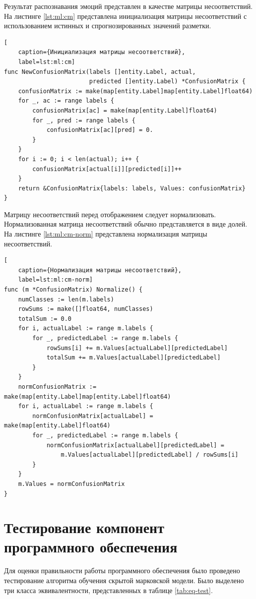Результат распознавания эмоций представлен в качестве матрицы несоответствий. На листинге \ref{lst:ml:cm} представлена инициализация матрицы несоответствий с использованием истинных и спрогнозированных значений разметки.
\begin{lstlisting}[
	caption={Инициализация матрицы несоответствий},
	label=lst:ml:cm]
func NewConfusionMatrix(labels []entity.Label, actual,
						predicted []entity.Label) *ConfusionMatrix {
	confusionMatrix := make(map[entity.Label]map[entity.Label]float64)
	for _, ac := range labels {
		confusionMatrix[ac] = make(map[entity.Label]float64)
		for _, pred := range labels {
			confusionMatrix[ac][pred] = 0.
		}
	}
	for i := 0; i < len(actual); i++ {
		confusionMatrix[actual[i]][predicted[i]]++
	}
	return &ConfusionMatrix{labels: labels, Values: confusionMatrix}
}
\end{lstlisting}
Матрицу несоответствий перед отображением следует нормализовать. Нормализованная матрица несоответствий обычно представляется в виде долей. На листинге \ref{lst:ml:cm-norm} представлена нормализация матрицы несоответствий.
\begin{lstlisting}[
	caption={Нормализация матрицы несоответствий},
	label=lst:ml:cm-norm]
func (m *ConfusionMatrix) Normalize() {
	numClasses := len(m.labels)
	rowSums := make([]float64, numClasses)
	totalSum := 0.0
	for i, actualLabel := range m.labels {
		for _, predictedLabel := range m.labels {
			rowSums[i] += m.Values[actualLabel][predictedLabel]
			totalSum += m.Values[actualLabel][predictedLabel]
		}
	}
	normConfusionMatrix := make(map[entity.Label]map[entity.Label]float64)
	for i, actualLabel := range m.labels {
		normConfusionMatrix[actualLabel] = make(map[entity.Label]float64)
		for _, predictedLabel := range m.labels {
			normConfusionMatrix[actualLabel][predictedLabel] = 
				m.Values[actualLabel][predictedLabel] / rowSums[i]
		}
	}
	m.Values = normConfusionMatrix
}
\end{lstlisting}


\section{Тестирование компонент программного обеспечения}
Для оценки правильности работы программного обеспечения было проведено тестирование алгоритма обучения скрытой марковской модели. Было выделено три класса эквивалентности, представленных в таблице \ref{tab:eq-test}.


